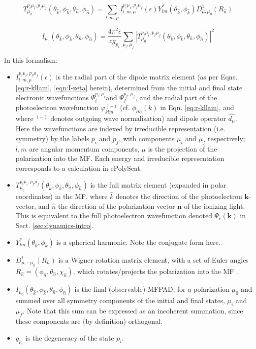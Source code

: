 \documentclass[10pt]{article}
\begin{document}
\begin{equation}
T_{\mu_{0}}^{p_{i}\mu_{i},p_{f}\mu_{f}}(\theta_{\hat{k}},\phi_{\hat{k}},\theta_{\hat{n}},\phi_{\hat{n}})=\sum_{l,m,\mu}I_{l,m,\mu}^{p_{i}\mu_{i},p_{f}\mu_{f}}(\epsilon)Y_{lm}^{*}(\theta_{\hat{k}},\phi_{\hat{k}})D_{\mu,\mu_{0}}^{1}(R_{\hat{n}})\label{eq:eps-TMF}
\end{equation}

\begin{equation}
I_{\mu_{0}}(\theta_{\hat{k}},\phi_{\hat{k}},\theta_{\hat{n}},\phi_{\hat{n}})=\frac{4\pi^{2}\epsilon}{cg_{p_{i}}}\sum_{\mu_{i},\mu_{f}}|T_{\mu_{0}}^{p_{i}\mu_{i},p_{f}\mu_{f}}(\theta_{\hat{k}},\phi_{\hat{k}},\theta_{\hat{n}},\phi_{\hat{n}})|^{2}\label{eq:eps-MFPAD}
\end{equation}

In this formalism:
\begin{itemize}
\item $I_{l,m,\mu}^{p_{i}\mu_{i},p_{f}\mu_{f}}(\epsilon)$ is the radial part of the dipole matrix element (as per Eqns. \ref{eq:r-kllam}, \ref{eqn:I-zeta} herein), determined from the initial and final state electronic wavefunctions $\Psi_{i}^{p_{i},\mu_{i}}$and $\Psi_{f}^{p_{f},\mu_{f}}$,
and the radial part of the photoelectron wavefunction $\varphi_{klm}^{(-)}$ (cf. $\phi_{lm}(k)$ in Eqn. \ref{eq:r-kllam}, and where $^{(-)}$ denotes outgoing wave normalisation) and dipole operator $\hat{d_{\mu}}$. Here the wavefunctions are indexed by irreducible representation (i.e. symmetry) by the labels $p_{i}$ and $p_{f}$, with components $\mu_{i}$ and $\mu_{f}$ respectively; $l,m$ are angular momentum components, $\mu$ is the projection of the polarization into the MF. Each energy and irreducible representation corresponds to a calculation in ePolyScat.
\item $T_{\mu_{0}}^{p_{i}\mu_{i},p_{f}\mu_{f}}(\theta_{\hat{k}},\phi_{\hat{k}},\theta_{\hat{n}},\phi_{\hat{n}})$
is the full matrix element (expanded in polar coordinates) in the
MF, where $\hat{k}$ denotes the direction of the photoelectron $\mathbf{k}$-vector, and $\hat{n}$ the direction of the polarization vector $\mathbf{n}$ of the ionizing light. This is equivalent to the full photoelectron wavefunction denoted $\Psi_e(\mathbf{k})$ in Sect. \ref{sec:dynamics-intro}.
\item $Y_{lm}^{*}(\theta_{\hat{k}},\phi_{\hat{k}})$ is a spherical harmonic. Note the conjugate form here.
\item $D_{\mu,-\mu_{0}}^{1}(R_{\hat{n}})$ is a Wigner rotation matrix element, with a set of Euler angles $R_{\hat{n}}=(\phi_{\hat{n}},\theta_{\hat{n}},\chi_{\hat{n}})$, which rotates/projects the polarization into the MF .
\item $I_{\mu_{0}}(\theta_{\hat{k}},\phi_{\hat{k}},\theta_{\hat{n}},\phi_{\hat{n}})$ is the final (observable) MFPAD, for a polarization $\mu_{0}$ and summed over all symmetry components of the initial and final states, $\mu_{i}$ and $\mu_{f}$. Note that this sum can be expressed as an incoherent summation, since these components are (by definition) orthogonal.
\item $g_{p_{i}}$ is the degeneracy of the state $p_{i}$.
\end{itemize}
\end{document}
